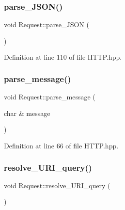 \mbox{\label{class_request_adc13ade88a8d868013fbc79d7ab645d4}} 
\subsubsection{\texorpdfstring{parse\+\_\+\+J\+S\+O\+N()}{parse\_JSON()}}
{\footnotesize\ttfamily void Request\+::parse\+\_\+\+J\+S\+ON (\begin{DoxyParamCaption}{ }\end{DoxyParamCaption})}



Definition at line 110 of file H\+T\+T\+P.\+hpp.

\mbox{\label{class_request_a7de5ef92f56abd5ed7aa2b78f5dddadb}} 
\subsubsection{\texorpdfstring{parse\+\_\+message()}{parse\_message()}}
{\footnotesize\ttfamily void Request\+::parse\+\_\+message (\begin{DoxyParamCaption}\item[{char \&}]{message }\end{DoxyParamCaption})}



Definition at line 66 of file H\+T\+T\+P.\+hpp.

\mbox{\label{class_request_a8b5ac840837aec546287976a11dc4b1a}} 
\subsubsection{\texorpdfstring{resolve\+\_\+\+U\+R\+I\+\_\+query()}{resolve\_URI\_query()}}
{\footnotesize\ttfamily void Request\+::resolve\+\_\+\+U\+R\+I\+\_\+query (\begin{DoxyParamCaption}{ }\end{DoxyParamCaption})}



